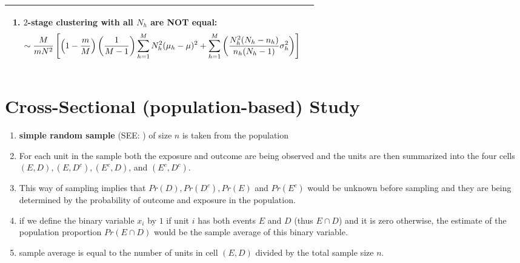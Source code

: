 \begin{longtable}{|p{2cm}|p{12cm}|}
\begin{minipage}{11cm}
\begin{enumerate}
            \item $2$-stage clustering with all $N_h$ are \textbf{NOT} equal:
            \[
                \sim
                \dfrac{M}{mN^2} \left[
                    \left(1- \dfrac{m}{M} \right)
                    \left(\dfrac{1}{M-1} \right)
                    \displaystyle\sum_{h=1}^{M}
                    N_h^2(\mu_h - \mu)^2
                    +
                    \displaystyle\sum_{h=1}^{M}
                    \left(
                        \dfrac{N_h^2 (N_h-n_h)}{n_h(N_h -1)}
                        \sigma_h^2
                    \right)
                \right]
            \]
        \end{enumerate}
        \vspace{0.2cm}
    \end{minipage}\\
    \hline

    
\end{longtable}


\section{Cross-Sectional (population-based) Study \cite{ism-1}}\label{Cross-Sectional (population-based) Study}

\begin{enumerate}
    \item \textbf{simple random sample} (SEE: ) of size $n$ is taken from the population

    \item For each unit in the sample both the exposure and outcome are being observed and the units are then summarized into the four cells $(E, D), (E, D^c), (E^c, D)$, and $(E^c, D^c)$.

    \item This way of sampling implies that $Pr(D), Pr(D^c), Pr(E)$ and $Pr(E^c)$ would be unknown before sampling and they are being determined by the probability of outcome and exposure in the population.

    \item if we define the binary variable $x_i$ by $1$ if unit $i$ has both events $E$ and $D$ (thus $E \cap D$) and it is zero otherwise, the estimate of the population proportion $Pr(E \cap D)$ would be the sample average of this binary variable. 

    \item sample average is equal to the number of units in cell $(E, D)$ divided by the total sample size $n$.

\end{enumerate}


